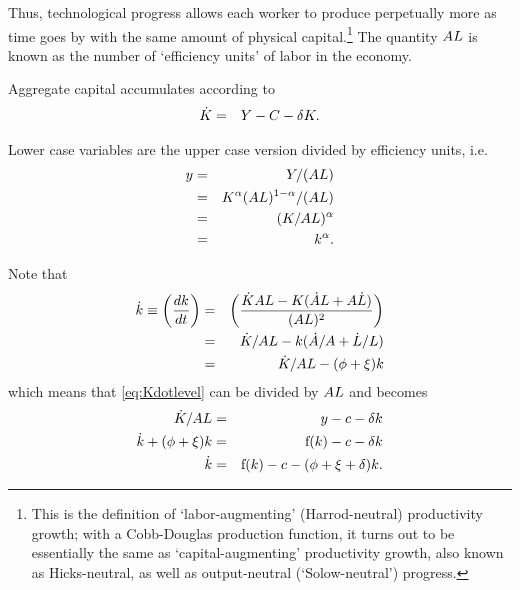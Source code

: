 \documentclass{handout}
\begin{document}
Thus, technological progress allows each worker to
produce perpetually more  as time goes by with the same amount of 
physical capital.\footnote{This is the definition of `labor-augmenting' (Harrod-neutral) 
  productivity growth; with a Cobb-Douglas production function, it turns out to be essentially the same as `capital-augmenting' productivity growth, also known as Hicks-neutral, as well as output-neutral (`Solow-neutral') progress.}  The quantity $A L$ is known as the number of `efficiency 
units' of labor in the economy.

Aggregate capital accumulates according to
\begin{eqnarray}
  \dot{{K}} & = & {Y} - C - \delta K \label{eq:Kdotlevel}.
\end{eqnarray}

Lower case variables are the upper case version divided by efficiency units, i.e.
\begin{eqnarray}
  {y} & = & {Y}/(A L)  \\
       & = & {K}^{\alpha}(A L)^{1-\alpha}/(A L)  \\
       & = & ({K}/A L)^{\alpha}
  \\   & = & {k}^{\alpha}    .
\end{eqnarray}

Note that 
\begin{eqnarray}
  \dot{{k}} \equiv       \left(\frac{d{k}}{dt}\right) & = & \left(\frac{\dot{{K}}A L - K(\dot{A }L + A \dot{L})}{(A L)^{2}}\right) 
  \\   & = & \dot{{K}}/A L - k(\dot{A }/{A } + \dot{L}/L)
  \\          & = & \dot{{K}}/A L - (\phi +\xi)k
\end{eqnarray}
which means that \eqref{eq:Kdotlevel} can be divided by $A L$ and becomes
\begin{eqnarray}
  \dot{{K}}/A L & = & {y} - c - \delta {k}  \\
  \dot{{k}}+(\phi +\xi)k & = & \mathrm{f}({k}) - c - \delta {k}  \\
  \dot{{k}} & = & \mathrm{f}({k}) - c - (\phi +\xi+\delta) {k} \label{eq:kdot}.
\end{eqnarray}
\end{document}
